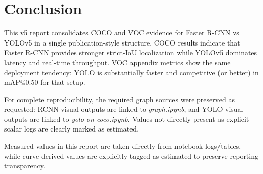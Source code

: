\documentclass[conference]{IEEEtran}
\begin{document}
\section{Conclusion}
This v5 report consolidates COCO and VOC evidence for Faster R-CNN vs YOLOv5 in a single publication-style structure. COCO results indicate that Faster R-CNN provides stronger strict-IoU localization while YOLOv5 dominates latency and real-time throughput. VOC appendix metrics show the same deployment tendency: YOLO is substantially faster and competitive (or better) in mAP@0.50 for that setup.

For complete reproducibility, the required graph sources were preserved as requested: RCNN visual outputs are linked to \textit{graph.ipynb}, and YOLO visual outputs are linked to \textit{yolo-on-coco.ipynb}. Values not directly present as explicit scalar logs are clearly marked as estimated.

Measured values in this report are taken directly from notebook logs/tables, while curve-derived values are explicitly tagged as estimated to preserve reporting transparency.

\FloatBarrier
\clearpage
\end{document}

